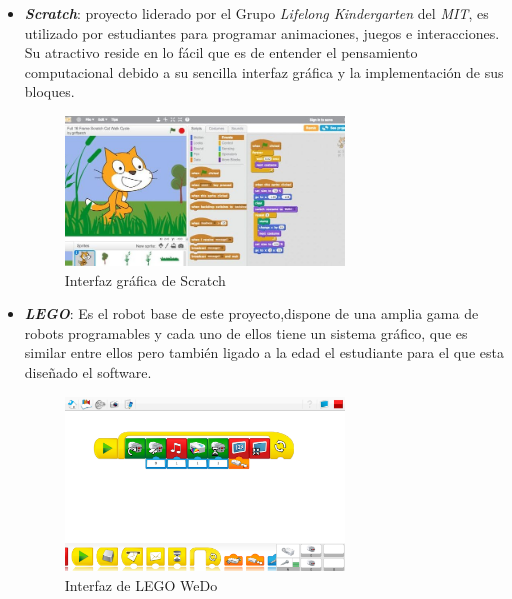 \begin{itemize}
    \item \textit{\textbf{Scratch}}\cite{bib:scratch}: proyecto liderado por el Grupo \textit{Lifelong Kindergarten} del \textit{MIT}, es utilizado por estudiantes para programar animaciones, juegos e interacciones. Su atractivo reside en lo fácil que es de entender el pensamiento computacional debido a su sencilla interfaz gráfica y la implementación de sus bloques.
    \begin{figure}[H]
    \centering
    \includegraphics[width=0.7\textwidth]{img/scratch.jpg}
    \caption{Interfaz gráfica de Scratch} \label{fig:scratch}
    \end{figure}

    \item \textit{\textbf{LEGO}}\cite{bib:lego}: Es el robot base de este proyecto,dispone de una amplia gama de robots programables y cada uno de ellos tiene un sistema gráfico, que es similar entre ellos pero también ligado a la edad el estudiante para el que esta diseñado el software. 

    \begin{figure}[H]
    \centering
    \includegraphics[width=0.7\textwidth]{img/lego1.png}
    \caption{Interfaz de LEGO WeDo} \label{fig:lego1}
    \end{figure}
    

\end{itemize}
